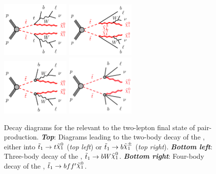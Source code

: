 \begin{figure}[!htb]
    \begin{center}
        \includegraphics[width=0.3\textwidth]{figures/search_stop2l/signal/fgraph_stop_tN} \hspace{1cm}
        \includegraphics[width=0.3\textwidth]{figures/search_stop2l/signal/fgraph_stop_bCN} \\
        \includegraphics[width=0.3\textwidth]{figures/search_stop2l/signal/fgraph_3body} \hspace{1cm}
        \includegraphics[width=0.3\textwidth]{figures/search_stop2l/signal/fgraph_stop_bffN}
        \caption{
            Decay diagrams for the \stopone relevant to the two-lepton final state of \stopone pair-production.
            \textit{\textbf{Top}}: Diagrams leading to the two-body decay of the \stopone, either
                into $\stopone \rightarrow t \ninoone$ (\textit{top left}) or $\stopone \rightarrow b \chinoonepm$ (\textit{top right}).
            \textit{\textbf{Bottom left}}: Three-body decay of the \stopone, $\stopone \rightarrow b W \ninoone$.
            \textit{\textbf{Bottom right}}: Four-body decay of the \stopone, $\stopone \rightarrow b f f^{\prime} \ninoone$.
        }
        \label{fig:stop_diagrams}
    \end{center}
\end{figure}


